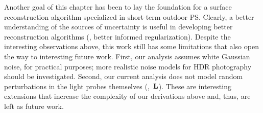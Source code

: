 Another goal of this chapter has been to lay the foundation for a surface reconstruction algorithm specialized in short-term outdoor PS. Clearly, a better understanding of the sources of uncertainty is useful in developing better reconstruction algorithms (\eg, better informed regularization). Despite the interesting observations above, this work still has some limitations that also open the way to interesting future work. First, our analysis assumes white Gaussian noise, for practical purposes; more realistic noise models for HDR photography should be investigated. Second, our current analysis does not model random perturbations in the light probes themselves (\ie,~${\bf L}$). These are interesting extensions that increase the complexity of our derivations above and, thus, are left as future work. %








 
